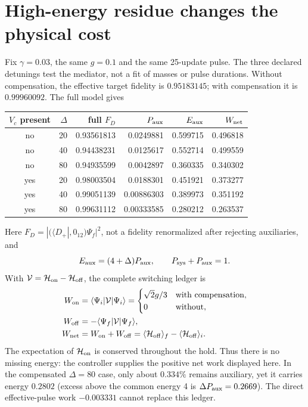 \documentclass[11pt,a4paper]{article}
\newcommand{\bra}[1]{\langle#1|}
\begin{document}
\section{High-energy residue changes the physical cost}
Fix $\gamma=0.03$, the same $g=0.1$ and the same 25-update pulse.
The three declared detunings test the mediator, not a fit of masses or
pulse durations. Without compensation, the effective target fidelity
is $0.95183145$; with compensation it is $0.99960092$. The full model gives
\begin{center}\small
\begin{tabular}{crrrrr}\toprule
$V_c$ present & $\Delta$ & full $F_D$ & $P_{\rm aux}$ & $E_{\rm aux}$ & $W_{\rm net}$\\\midrule
no & 20 & 0.93561813 & 0.0249881 & 0.599715 & 0.496818\\
no & 40 & 0.94438231 & 0.0125617 & 0.552714 & 0.499559\\
no & 80 & 0.94935599 & 0.0042897 & 0.360335 & 0.340302\\
yes & 20 & 0.98003504 & 0.0188301 & 0.451921 & 0.373277\\
yes & 40 & 0.99051139 & 0.00886303 & 0.389973 & 0.351192\\
yes & 80 & 0.99631112 & 0.00333585 & 0.280212 & 0.263537\\\bottomrule
\end{tabular}
\end{center}
Here $F_D=|(\bra{D_+},0_{12})\Psi_f|^2$, not a fidelity
renormalized after rejecting auxiliaries, and
\begin{equation}
 E_{\rm aux}=(4+\Delta)P_{\rm aux},\qquad
 P_{\rm sys}+P_{\rm aux}=1.
\end{equation}
With $\mathcal V=\mathcal H_{\rm on}-\mathcal H_{\rm off}$, the complete
switching ledger is
\begin{align}
 W_{\rm on}&=\langle\Psi_i|\mathcal V|\Psi_i\rangle
 =\begin{cases}\sqrt2g/3&\text{with compensation},\\0&\text{without},\end{cases}\\
 W_{\rm off}&=-\langle\Psi_f|\mathcal V|\Psi_f\rangle,\\
 W_{\rm net}&=W_{\rm on}+W_{\rm off}
 =\langle\mathcal H_{\rm off}\rangle_f
  -\langle\mathcal H_{\rm off}\rangle_i.\label{relay-work}
\end{align}
The expectation of $\mathcal H_{\rm on}$ is conserved throughout the
hold. Thus there is no missing energy: the controller supplies the
positive net work displayed here. In the compensated $\Delta=80$ case,
only about $0.334\%$ remains auxiliary, yet it carries energy $0.2802$
(excess above the common energy 4 is $\Delta P_{\rm aux}=0.2669$).
The direct effective-pulse work $-0.003331$ cannot replace this ledger.
\end{document}
